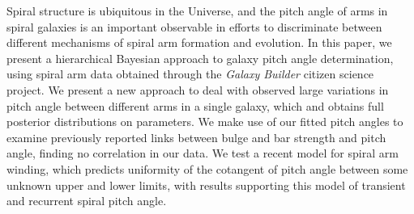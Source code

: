 Spiral structure is ubiquitous in the Universe, and the pitch angle of arms in spiral galaxies is an important observable in efforts to discriminate between different mechanisms of spiral arm formation and evolution. In this paper, we present a hierarchical Bayesian approach to galaxy pitch angle determination, using spiral arm data obtained through the \textit{Galaxy Builder} citizen science project. We present a new approach to deal with observed large variations in pitch angle between different arms in a single galaxy, which and obtains full posterior distributions on parameters. We make use of our fitted pitch angles to examine previously reported links between bulge and bar strength and pitch angle, finding no correlation in our data. We test a recent model for spiral arm winding, which predicts uniformity of the cotangent of pitch angle between some unknown upper and lower limits, with results supporting this model of transient and recurrent spiral pitch angle.
